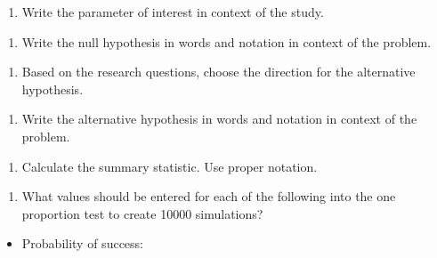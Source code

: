 \documentclass[
]{report}
\providecommand{\tightlist}{%
  \setlength{\itemsep}{0pt}\setlength{\parskip}{0pt}}
\begin{document}
\begin{enumerate}
\def\labelenumi{\arabic{enumi}.}
\tightlist
\item
  Write the parameter of interest in context of the study.
\end{enumerate}

\vspace{0.8in}

\begin{enumerate}
\def\labelenumi{\arabic{enumi}.}
\setcounter{enumi}{1}
\tightlist
\item
  Write the null hypothesis in words and notation in context of the problem.
\end{enumerate}

\vspace{1in}

\begin{enumerate}
\def\labelenumi{\arabic{enumi}.}
\setcounter{enumi}{2}
\tightlist
\item
  Based on the research questions, choose the direction for the alternative hypothesis.
\end{enumerate}

\vspace{0.3in}

\begin{enumerate}
\def\labelenumi{\arabic{enumi}.}
\setcounter{enumi}{3}
\tightlist
\item
  Write the alternative hypothesis in words and notation in context of the problem.
\end{enumerate}

\vspace{1in}

\begin{enumerate}
\def\labelenumi{\arabic{enumi}.}
\setcounter{enumi}{4}
\tightlist
\item
  Calculate the summary statistic. Use proper notation.
\end{enumerate}

\vspace{0.3in}

\begin{enumerate}
\def\labelenumi{\arabic{enumi}.}
\setcounter{enumi}{5}
\tightlist
\item
  What values should be entered for each of the following into the one proportion test to create 10000 simulations?
\end{enumerate}

\begin{itemize}
\tightlist
\item
  Probability of success:
\end{itemize}
\end{document}
